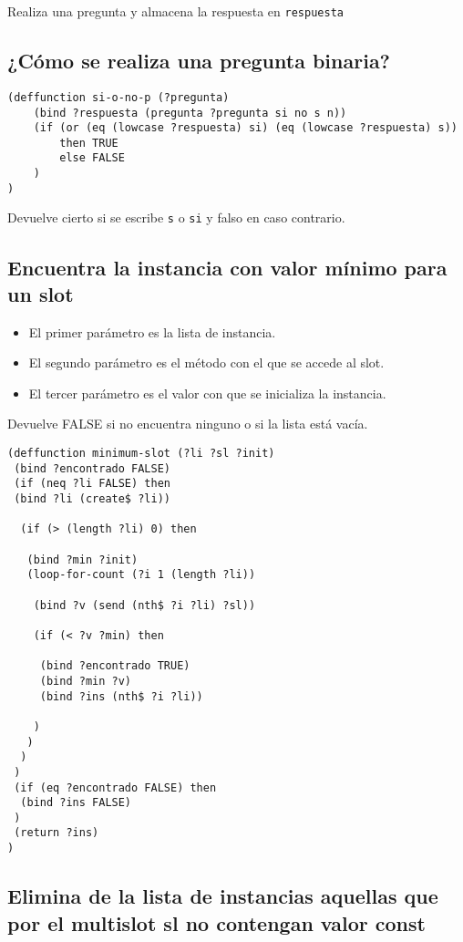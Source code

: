 \documentclass[11pt,svgnames]{scrbook}
\begin{document}
Realiza una pregunta y almacena la respuesta en \texttt{respuesta}

\subsection{¿Cómo se realiza una pregunta binaria?}


\begin{verbatim}
(deffunction si-o-no-p (?pregunta)
    (bind ?respuesta (pregunta ?pregunta si no s n))
    (if (or (eq (lowcase ?respuesta) si) (eq (lowcase ?respuesta) s))
        then TRUE
        else FALSE
    )
) \end{verbatim}

Devuelve cierto si se escribe \texttt{s} o \texttt{si} y falso en caso contrario.

\subsection{Encuentra la instancia con valor mínimo para un slot }

\begin{itemize}
\item  El primer parámetro es la lista de instancia.
\item El segundo parámetro es el método con el que se accede al slot.
\item El tercer parámetro es el valor con que se inicializa la instancia.
\end{itemize}


Devuelve FALSE si no encuentra ninguno o si la lista está vacía.


\begin{verbatim}
(deffunction minimum-slot (?li ?sl ?init)
 (bind ?encontrado FALSE)
 (if (neq ?li FALSE) then
 (bind ?li (create$ ?li))

  (if (> (length ?li) 0) then

   (bind ?min ?init)
   (loop-for-count (?i 1 (length ?li))

    (bind ?v (send (nth$ ?i ?li) ?sl))

    (if (< ?v ?min) then

     (bind ?encontrado TRUE)
     (bind ?min ?v)
     (bind ?ins (nth$ ?i ?li))

    )
   )
  )
 )
 (if (eq ?encontrado FALSE) then
  (bind ?ins FALSE)
 )
 (return ?ins)
)
\end{verbatim}

\subsection{Elimina de la lista de instancias aquellas que por el multislot sl no contengan valor const}
\end{document}
